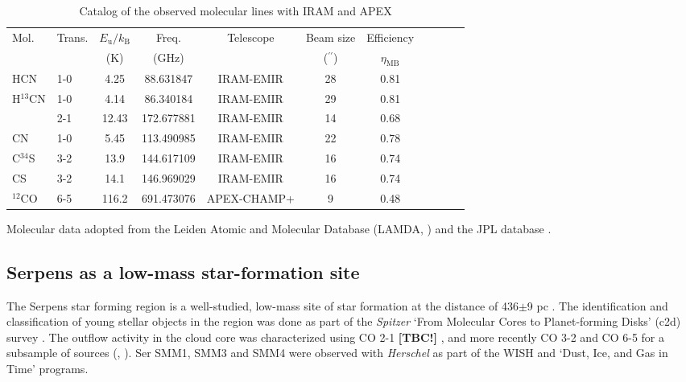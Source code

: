 \documentclass{aa}
\begin{document}
\begin{table*} 
\caption{Catalog of the observed molecular lines with IRAM and APEX \label{table:lines}}          
\centering                        
\begin{tabular}{l l c c c c c c c c c }
\hline \hline                 
 Mol. & Trans. & $E_\mathrm{u}/k_\mathrm{B}$ & Freq. & Telescope  & Beam size & Efficiency  \\
  &  & (K) & (GHz)  &  &($^{\prime\prime}$) & $\eta_\mathrm{MB}$\\ 
\hline                        %
HCN & 1-0 & 4.25 & 88.631847 & IRAM-EMIR  & 28 & 0.81 \\ 
H$^{13}$CN & 1-0 & 4.14 & 86.340184 & IRAM-EMIR & 29 & 0.81 \\ 
~ & 2-1 & 12.43 & 172.677881 & IRAM-EMIR & 14 & 0.68 \\ 
CN & 1-0  & 5.45 & 113.490985 & IRAM-EMIR  & 22 & 0.78 \\ 
C$^{34}$S & 3-2 &  13.9 & 144.617109 & IRAM-EMIR & 16 & 0.74 \\
CS & 3-2 &  14.1 & 146.969029 & IRAM-EMIR & 16 & 0.74 \\ 
$^{12}$CO & 6-5 & 116.2 &  691.473076 & APEX-CHAMP+ & 9 & 0.48 \\
\hline 
\end{tabular} 
\begin{flushleft} 
Molecular data adopted from the Leiden Atomic and Molecular Database (LAMDA, \citealt{Sch05})
and the JPL database \textbf{\citep{Pic98}}.
\end{flushleft} 
\end{table*}
\subsection{Serpens as a low-mass star-formation site}

The Serpens star forming region is a well-studied, low-mass site of star formation at the 
distance of 436$\pm$9 pc \citep{Ort17}. The identification and classification of young 
stellar objects in the region was done as part of the \textit{Spitzer} ‘From Molecular Cores to
Planet-forming Disks’ (c2d) survey \citep{Har07,Eno09,Eva09,Dun15}. 
The outflow activity in the cloud core was characterized using CO 2-1 \textbf{[TBC!]} \citep{Cas93,Hur96,Tes98,Dav99}, and 
more recently CO 3-2 and CO 6-5 for a subsample of sources (\textbf{\citealt{Dio10}}, \citealt{Yil15}). Ser SMM1, SMM3 and 
SMM4 were observed with \textit{Herschel} as part of the WISH and `Dust, Ice, and Gas in Time' 
\citep[DIGIT,][]{Gre13,Gre16,YL18} programs. 
\end{document}

